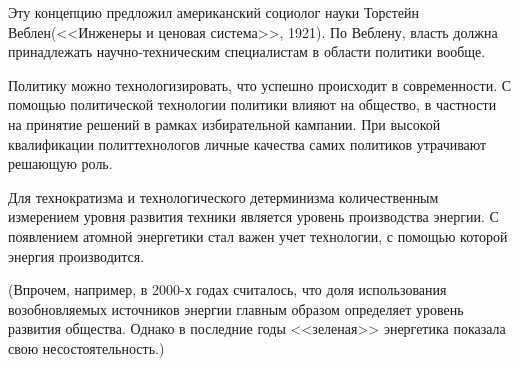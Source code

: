 Эту концепцию предложил американский социолог науки Торстейн Веблен(<<Инженеры и ценовая система>>, 1921). По Веблену, власть должна принадлежать научно-техническим специалистам в области политики вообще.

Политику можно технологизировать, что успешно происходит в современности. С помощью политической технологии политики влияют на общество, в частности на принятие решений в рамках избирательной кампании. При высокой квалификации политтехнологов личные качества самих политиков утрачивают решающую роль.


Для технократизма и технологического детерминизма количественным измерением уровня развития техники является уровень производства энергии. С появлением атомной энергетики стал важен учет технологии, с помощью которой энергия производится. 

(Впрочем, например, в 2000-х годах считалось, что доля использования возобновляемых источников энергии главным образом определяет уровень развития общества. Однако в последние годы <<зеленая>> энергетика показала свою несостоятельность.)


